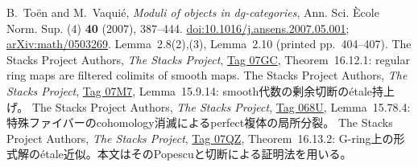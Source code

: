 B.~To\"en and M.~Vaqui\'e,
\emph{Moduli of objects in dg-categories},
Ann. Sci. \`Ecole Norm. Sup. (4) \textbf{40} (2007), 387--444.
\href{https://doi.org/10.1016/j.ansens.2007.05.001}{doi:10.1016/j.ansens.2007.05.001};
\href{https://arxiv.org/abs/math/0503269}{arXiv:math/0503269}.
Lemma~2.8(2),(3), Lemma~2.10 (printed pp.~404--407).
The Stacks Project Authors, \emph{The Stacks Project},
\href{https://stacks.math.columbia.edu/tag/07GC}{Tag 07GC},
Theorem~16.12.1: regular ring maps are filtered colimits of smooth maps.
The Stacks Project Authors, \emph{The Stacks Project},
\href{https://stacks.math.columbia.edu/tag/07M7}{Tag 07M7}, Lemma~15.9.14:
smooth代数の剰余切断の\'etale持上げ。
The Stacks Project Authors, \emph{The Stacks Project},
\href{https://stacks.math.columbia.edu/tag/068U}{Tag 068U}, Lemma~15.78.4:
特殊ファイバーのcohomology消滅によるperfect複体の局所分裂。
The Stacks Project Authors, \emph{The Stacks Project},
\href{https://stacks.math.columbia.edu/tag/07QZ}{Tag 07QZ}, Theorem~16.13.2:
G-ring上の形式解の\'etale近似。本文はそのPopescuと切断による証明法を用いる。
